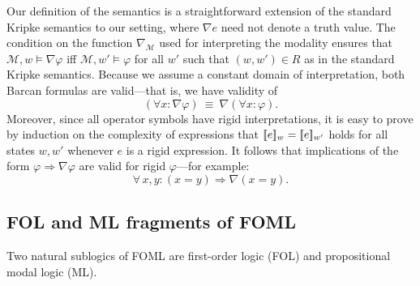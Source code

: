 \documentclass{easychair}
\renewcommand{\implies}{\Rightarrow}
\newcommand{\sem}[1]{\ensuremath{[\![ #1 ]\!]}}
\newcommand{\modal}{\nabla}
\newcommand{\MM}{\mathcal{M}}
\newcommand{\edmargin}[2]{\marginpar{\raggedright\footnotesize\color{red}#1: #2}}
\newcommand{\edmargin}[2]{}
\def\llmargin{\edmargin{LL}}
\let\notla\relax
\def\A{\forall\,}
\begin{document}
Our definition of the semantics is a straightforward extension of the standard
Kripke semantics to our setting, where $\modal e$ need not denote a truth value.
The condition on the function $\modal_{\MM}$ used for interpreting the modality
ensures that $\MM,w \models \modal \varphi$ iff $\MM,w' \models \varphi$ for all
$w'$ such that $(w,w') \in R$ as in the standard Kripke semantics.
Because we assume a constant domain of interpretation, both Barcan formulas are
valid---that is, we have validity of%
\begin{equation}\label{eq:barcan}
  (\forall x : \modal \varphi)\ \equiv\ \modal(\forall x: \varphi).
\end{equation}
%
Moreover, since all operator symbols have rigid interpretations, it is easy to
prove by induction on the complexity of expressions that $\notla\sem{e}_w =
\sem{e}_{w'}$ holds for all states $w,w'$ whenever $e$ is a rigid expression.
It follows that implications of the form
%
\(
  \varphi \implies \modal \varphi
\)
%
are valid for rigid $\varphi$---for example:
%
\begin{equation}\label{eq:rigid-box}
  \A x,y : (x=y) \implies \modal(x=y).
\end{equation}



\subsection{FOL and ML fragments of FOML}

Two natural sublogics of FOML are first-order logic (FOL) and propositional modal
logic (ML).

\end{document}
